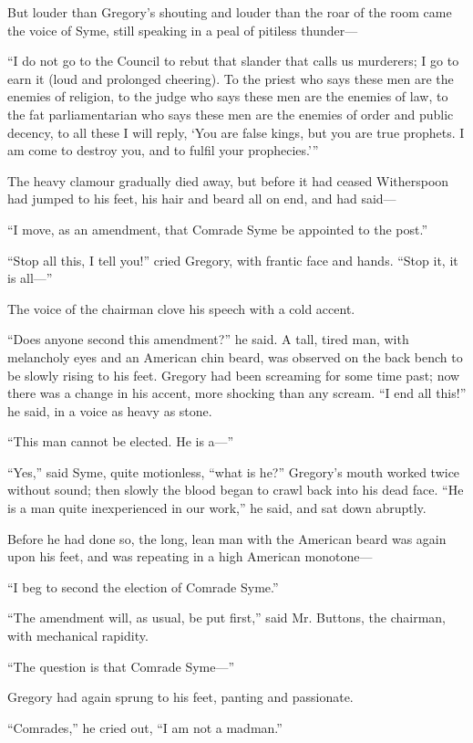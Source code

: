 But louder than Gregory’s shouting and louder than the roar of the room came the voice of Syme, still speaking in a peal of pitiless thunder⁠—

“I do not go to the Council to rebut that slander that calls us murderers; I go to earn it (loud and prolonged cheering). To the priest who says these men are the enemies of religion, to the judge who says these men are the enemies of law, to the fat parliamentarian who says these men are the enemies of order and public decency, to all these I will reply, ‘You are false kings, but you are true prophets. I am come to destroy you, and to fulfil your prophecies.’ ”

The heavy clamour gradually died away, but before it had ceased Witherspoon had jumped to his feet, his hair and beard all on end, and had said⁠—

“I move, as an amendment, that Comrade Syme be appointed to the post.”

“Stop all this, I tell you!” cried Gregory, with frantic face and hands. “Stop it, it is all⁠—”

The voice of the chairman clove his speech with a cold accent.

“Does anyone second this amendment?” he said. A tall, tired man, with melancholy eyes and an American chin beard, was observed on the back bench to be slowly rising to his feet. Gregory had been screaming for some time past; now there was a change in his accent, more shocking than any scream. “I end all this!” he said, in a voice as heavy as stone.

“This man cannot be elected. He is a⁠—”

“Yes,” said Syme, quite motionless, “what is he?” Gregory’s mouth worked twice without sound; then slowly the blood began to crawl back into his dead face. “He is a man quite inexperienced in our work,” he said, and sat down abruptly.

Before he had done so, the long, lean man with the American beard was again upon his feet, and was repeating in a high American monotone⁠—

“I beg to second the election of Comrade Syme.”

“The amendment will, as usual, be put first,” said Mr. Buttons, the chairman, with mechanical rapidity.

“The question is that Comrade Syme⁠—”

Gregory had again sprung to his feet, panting and passionate.

“Comrades,” he cried out, “I am not a madman.”

